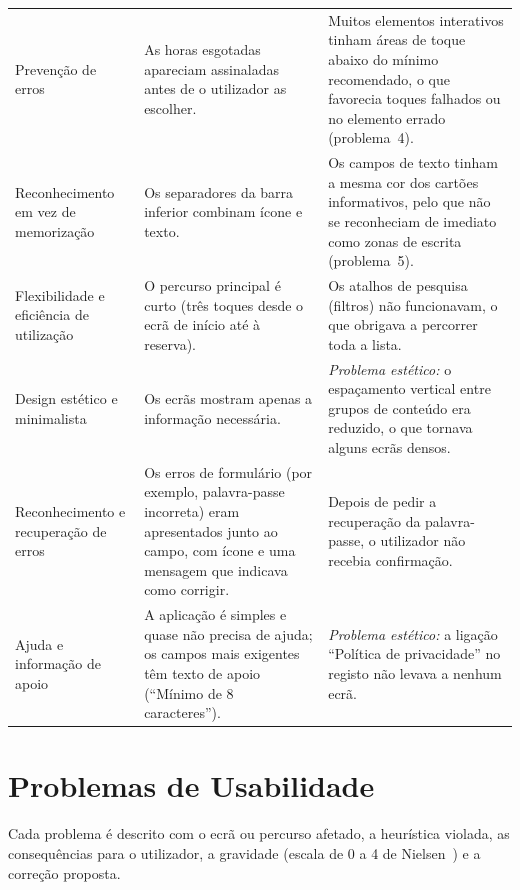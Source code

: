 {\begin{longtable}{>{\raggedright\arraybackslash}p{3cm}
                  >{\raggedright\arraybackslash}p{5.6cm}
                  >{\raggedright\arraybackslash}p{5.6cm}}
  Prevenção de erros
  & As horas esgotadas apareciam assinaladas antes de o utilizador as escolher.
  & Muitos elementos interativos tinham áreas de toque abaixo do mínimo recomendado, o que
    favorecia toques falhados ou no elemento errado (problema~4). \\
  \addlinespace

  Reconhecimento em vez de memorização
  & Os separadores da barra inferior combinam ícone e texto.
  & Os campos de texto tinham a mesma cor dos cartões informativos, pelo que não se
    reconheciam de imediato como zonas de escrita (problema~5). \\
  \addlinespace

  Flexibilidade e eficiência de utilização
  & O percurso principal é curto (três toques desde o ecrã de início até à reserva).
  & Os atalhos de pesquisa (filtros) não funcionavam, o que obrigava a percorrer toda a lista. \\
  \addlinespace

  Design estético e minimalista
  & Os ecrãs mostram apenas a informação necessária.
  & \emph{Problema estético:} o espaçamento vertical entre grupos de conteúdo era reduzido, o
    que tornava alguns ecrãs densos. \\
  \addlinespace

  Reconhecimento e recuperação de erros
  & Os erros de formulário (por exemplo, palavra-passe incorreta) eram apresentados junto ao
    campo, com ícone e uma mensagem que indicava como corrigir.
  & Depois de pedir a recuperação da palavra-passe, o utilizador não recebia confirmação. \\
  \addlinespace

  Ajuda e informação de apoio
  & A aplicação é simples e quase não precisa de ajuda; os campos mais exigentes têm texto de
    apoio (``Mínimo de 8 caracteres'').
  & \emph{Problema estético:} a ligação ``Política de privacidade'' no registo não levava a
    nenhum ecrã. \\
\end{longtable}}


\section{Problemas de Usabilidade}
\label{sec:problemas}

Cada problema é descrito com o ecrã ou percurso afetado, a heurística violada, as consequências
para o utilizador, a gravidade (escala de 0 a 4 de Nielsen~\cite{nielsen}) e a correção proposta.

